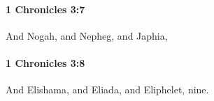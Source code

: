 		\paragraph{1 Chronicles 3:7} %
			\label{1CHRONICLES-3-7}

			And Nogah, and Nepheg, and Japhia,


		\paragraph{1 Chronicles 3:8} %
			\label{1CHRONICLES-3-8}

			And Elishama, and Eliada, and Eliphelet, nine.


